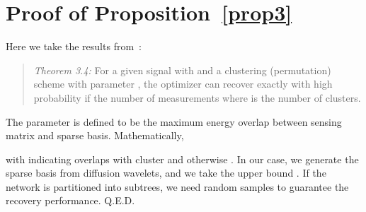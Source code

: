 \documentclass[conference]{IEEEtran}
\begin{document}
\section{Proof of Proposition~\ref{prop3}} \label{apx:prop3}

Here we take the results from~\cite{LeeO-ASC10}:
  \begin{quote}
  \textit{Theorem 3.4:} For a given signal  with  and a clustering (permutation) scheme with parameter , the  optimizer can recover  exactly with high probability if the number of measurements  where  is the number of clusters.
  \end{quote}
The parameter  is defined to be the maximum energy overlap between sensing matrix and sparse basis. Mathematically,

with  indicating  overlaps with cluster  and otherwise . In our case, we generate the sparse basis from diffusion wavelets, and we take the upper bound . If the network is partitioned into  subtrees, we need  random samples to guarantee the recovery performance. \hfill Q.E.D.
\end{document}
